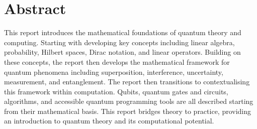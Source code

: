 \chapter*{Abstract}

This report introduces the mathematical foundations of quantum theory and computing. Starting with developing key concepts including linear algebra, probability, Hilbert spaces, Dirac notation, and linear operators. Building on these concepts, the report then develops the mathematical framework for quantum phenomena including superposition, interference, uncertainty, measurement, and entanglement. The report then transitions to contextualising this framework within computation. Qubits, quantum gates and circuits, algorithms, and accessible quantum programming tools are all described starting from their mathematical basis. This report bridges theory to practice, providing an introduction to quantum theory and its computational potential.
